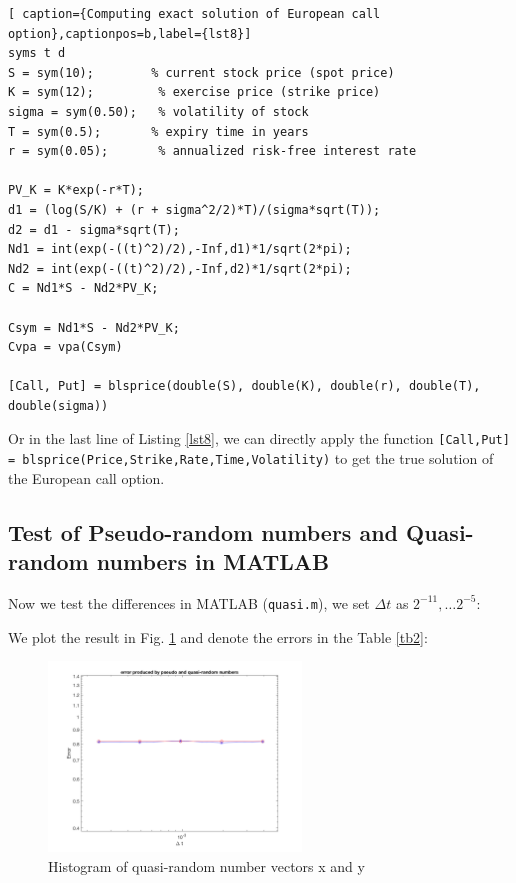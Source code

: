 \documentclass[12pt,a4paper]{article}
\theoremstyle{definition}
\begin{document}
\begin{lstlisting}[ caption={Computing exact solution of European call option},captionpos=b,label={lst8}]
syms t d
S = sym(10);        % current stock price (spot price)
K = sym(12);         % exercise price (strike price)
sigma = sym(0.50);   % volatility of stock
T = sym(0.5);       % expiry time in years
r = sym(0.05);       % annualized risk-free interest rate

PV_K = K*exp(-r*T);
d1 = (log(S/K) + (r + sigma^2/2)*T)/(sigma*sqrt(T));
d2 = d1 - sigma*sqrt(T);
Nd1 = int(exp(-((t)^2)/2),-Inf,d1)*1/sqrt(2*pi);
Nd2 = int(exp(-((t)^2)/2),-Inf,d2)*1/sqrt(2*pi);
C = Nd1*S - Nd2*PV_K;

Csym = Nd1*S - Nd2*PV_K;
Cvpa = vpa(Csym)

[Call, Put] = blsprice(double(S), double(K), double(r), double(T), double(sigma))
\end{lstlisting}

Or in the last line of Listing \ref{lst8}, we can directly apply the function \lstinline{[Call,Put] = blsprice(Price,Strike,Rate,Time,Volatility)} to get the true solution of the European call option.

\subsection{Test of Pseudo-random numbers and Quasi-random numbers in MATLAB}

Now we test the differences in MATLAB (\verb|quasi.m|), we set $\Delta t$ as $2^{-11},\dots 2^{-5}$:



We plot the result in Fig. \ref{fig15} and denote the errors in the Table \ref{tb2}:
\begin{figure}[htbp]
\centering
\includegraphics[width=0.6\textwidth]{fig/fig15.png}
\caption{\label{fig15} Histogram of quasi-random number vectors x and y}
\end{figure}
\end{document}
